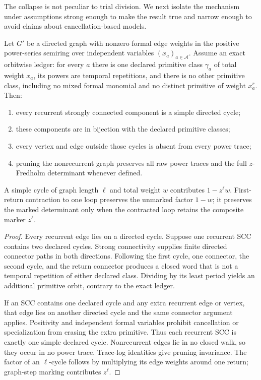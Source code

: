 The collapse is not peculiar to trial division.  We next isolate the
mechanism under assumptions strong enough to make the result true and narrow
enough to avoid claims about cancellation-based models.

\begin{theorem}
\label{thm:ledger-pruning}
Let $G'$ be a directed graph with nonzero formal edge weights in the positive
power-series semiring over independent variables $(x_a)_{a\in\mathcal A}$.
Assume an exact orbitwise ledger: for every $a$ there is one declared
primitive class $\gamma_a$ of total weight $x_a$, its powers are temporal
repetitions, and there is no other primitive class, including no mixed formal
monomial and no distinct primitive of weight $x_a^r$.  Then:

\begin{enumerate}
\item every recurrent strongly connected component is a simple directed
  cycle;
\item these components are in bijection with the declared primitive classes;
\item every vertex and edge outside those cycles is absent from every power
  trace;
\item pruning the nonrecurrent graph preserves all raw power traces and the
  full $z$-Fredholm determinant whenever defined.
\end{enumerate}

A simple cycle of graph length $\ell$ and total weight $w$ contributes
$1-z^\ell w$.  First-return contraction to one loop preserves the unmarked
factor $1-w$; it preserves the marked determinant only when the contracted
loop retains the composite marker $z^\ell$.
\end{theorem}

\begin{proof}
Every recurrent edge lies on a directed cycle.  Suppose one recurrent SCC
contains two declared cycles.  Strong connectivity supplies finite directed
connector paths in both directions.  Following the first cycle, one
connector, the second cycle, and the return connector produces a closed word
that is not a temporal repetition of either declared class.  Dividing by its
least period yields an additional primitive orbit, contrary to the exact
ledger.

If an SCC contains one declared cycle and any extra recurrent edge or vertex,
that edge lies on another directed cycle and the same connector argument
applies.  Positivity and independent formal variables prohibit cancellation
or specialization from erasing the extra primitive.  Thus each recurrent SCC
is exactly one simple declared cycle.  Nonrecurrent edges lie in no closed
walk, so they occur in no power trace.  Trace-log identities give pruning
invariance.  The factor of an $\ell$-cycle follows by multiplying its edge
weights around one return; graph-step marking contributes $z^\ell$.
\end{proof}

